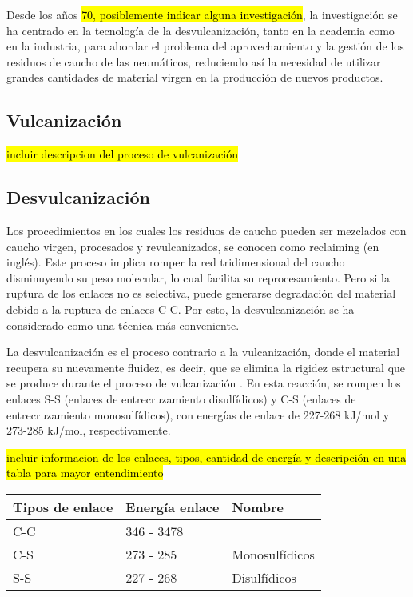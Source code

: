 Desde los años \hl{70, posiblemente indicar alguna investigación}, la investigación se ha centrado en la tecnología de la desvulcanización, tanto en la academia como en la industria, para abordar el problema del aprovechamiento y la gestión de los residuos de caucho de las neumáticos, reduciendo así la necesidad de utilizar grandes cantidades de material virgen en la producción de nuevos productos.

\begin{multicols}{2}

\subsection{\textbf{\large{Vulcanización}}}

\hl{incluir descripcion del proceso de vulcanización}


\subsection{\textbf{\large{Desvulcanización}}}


Los procedimientos en los cuales los residuos de caucho pueden ser mezclados con caucho virgen, procesados y revulcanizados, se conocen como reclaiming (en inglés). Este proceso implica romper la red tridimensional del caucho disminuyendo su peso molecular, lo cual facilita su reprocesamiento. Pero si la ruptura de los enlaces no es selectiva, puede generarse degradación del material debido a la ruptura de enlaces C-C. Por esto, la desvulcanización se ha considerado como una técnica más conveniente.

La desvulcanización es el proceso contrario a la vulcanización, donde el material recupera su nuevamente fluidez, es decir, que se elimina la rigidez estructural que se produce durante el proceso de vulcanización \cite{Garcia2015}. En esta reacción, se rompen los enlaces S-S (enlaces de entrecruzamiento disulfídicos) y C-S (enlaces de entrecruzamiento monosulfídicos), con energías de enlace de 227-268 kJ/mol y 273-285 kJ/mol, respectivamente.  




\hl{incluir informacion de los enlaces, tipos, cantidad de energía y descripción en una tabla para mayor entendimiento}

\begin{tabular}{|p{2cm}|p{2cm}|p{2.5cm}|}
\hline
\centering
\textbf{Tipos de enlace} & \textbf{Energía enlace} & \textbf{Nombre} \\ \hline
C-C & 346 - 3478 & \\ \hline
C-S & 273 - 285 & Monosulfídicos \\ \hline
S-S & 227 - 268 & Disulfídicos \\ \hline
\end{tabular}



\end{multicols}
